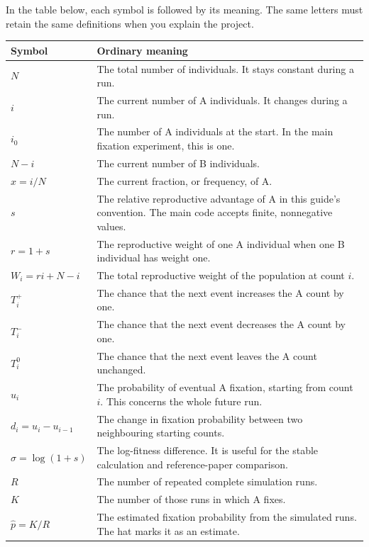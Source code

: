 In the table below, each symbol is followed by its meaning. The same letters
must retain the same definitions when you explain the project.

\begin{longtable}{p{}p{}}
\toprule
Symbol & Ordinary meaning \\
\midrule
\endhead
\(N\) & The total number of individuals. It stays constant during a run. \\
\(i\) & The current number of A individuals. It changes during a run. \\
\(i_0\) & The number of A individuals at the start. In the main fixation
            experiment, this is one. \\
\(N-i\) & The current number of B individuals. \\
\(x=i/N\) & The current fraction, or frequency, of A. \\
\(s\) & The relative reproductive advantage of A in this guide's convention.
          The main code accepts finite, nonnegative values. \\
\(r=1+s\) & The reproductive weight of one A individual when one B
              individual has weight one. \\
\(W_i=ri+N-i\) & The total reproductive weight of the population at count
                   \(i\). \\
\(T_i^+\) & The chance that the next event increases the A count by one. \\
\(T_i^-\) & The chance that the next event decreases the A count by one. \\
\(T_i^0\) & The chance that the next event leaves the A count unchanged. \\
\(u_i\) & The probability of eventual A fixation, starting from count
            \(i\). This concerns the whole future run. \\
\(d_i=u_i-u_{i-1}\) & The change in fixation probability between two
                       neighbouring starting counts. \\
\(\sigma=\log(1+s)\) & The log-fitness difference. It is useful for the
                        stable calculation and reference-paper comparison. \\
\(R\) & The number of repeated complete simulation runs. \\
\(K\) & The number of those runs in which A fixes. \\
\(\widehat p=K/R\) & The estimated fixation probability from the simulated
                      runs. The hat marks it as an estimate. \\

\end{longtable}

